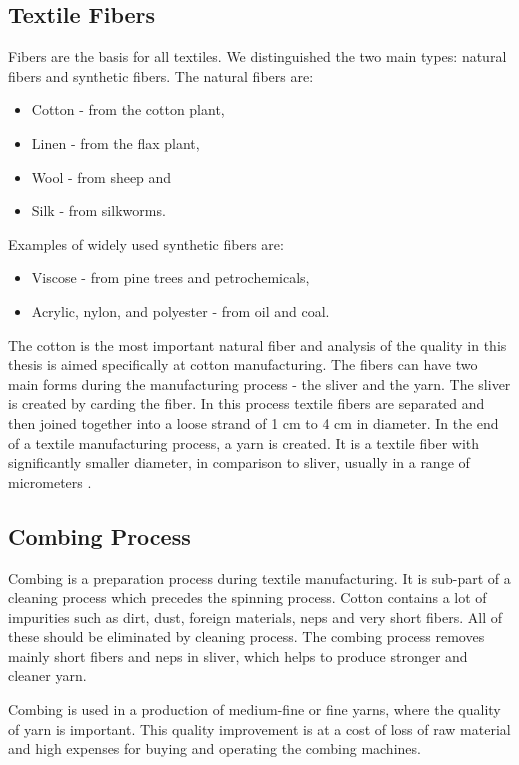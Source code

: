 \documentclass[twoside]{ctuthesis}
\theoremstyle{plain}
\theoremstyle{definition}
\theoremstyle{note}
\begin{document}
\subsection{Textile Fibers}
\label{textileFibers}
Fibers are the basis for all textiles. We distinguished the two main types: natural fibers and synthetic fibers. The natural fibers are:
\begin{itemize}
	\setlength{\itemsep}{5pt}
\item Cotton - from the cotton plant,
\item Linen - from the flax plant,
\item Wool - from sheep and
\item Silk - from silkworms.
\end{itemize}
Examples of widely used synthetic fibers are:
\begin{itemize}
	\setlength{\itemsep}{5pt}
\item Viscose - from pine trees and petrochemicals,

\item Acrylic, nylon, and polyester - from oil and coal. 
\end{itemize}
The cotton is the most important natural fiber and analysis of the quality in this thesis is aimed specifically at cotton manufacturing. 
The fibers can have two main forms during the manufacturing process - the sliver and the yarn. The sliver is created by carding the fiber. In this process textile fibers are separated and then joined together into a loose strand of 1 cm to 4 cm in diameter. In the end of a textile manufacturing process, a yarn is created. It is a textile fiber with significantly smaller diameter, in comparison to sliver, usually in a range of micrometers \cite{cite:FoFF}. 
\subsection{Combing Process}
\label{sec:Combing}
Combing is a preparation process during textile manufacturing. It is sub-part of a cleaning process which precedes the spinning process. Cotton contains a lot of impurities such as dirt, dust, foreign materials, neps and very short fibers. All of these should be eliminated by cleaning process. The combing process removes mainly short fibers and neps in sliver, which helps to produce stronger and cleaner yarn.

Combing is used in a production of medium-fine or fine yarns, where the quality of yarn is important. This quality improvement is at a cost of loss of raw material and high expenses for buying and operating the combing machines. 
\end{document}
